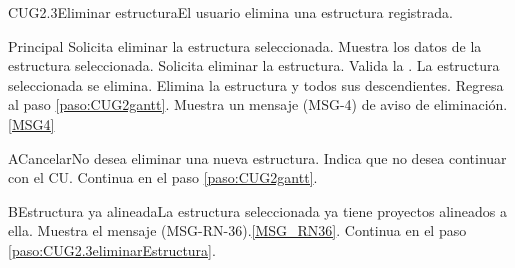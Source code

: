 	\begin{UseCase}{CUG2.3}{Eliminar estructura}{El usuario elimina una estructura registrada.}
	\end{UseCase}

	\begin{UCtrayectoria}{Principal}
		\UCpaso[\UCactor] Solicita eliminar la estructura seleccionada.
		\UCpaso Muestra los datos de la estructura seleccionada. \label{paso:CUG2.3eliminarEstructura}
		\UCpaso [\UCactor] Solicita eliminar la estructura. 
		\UCpaso Valida la . 
		\UCpaso La estructura seleccionada se elimina.
		\UCpaso Elimina la estructura y todos sus descendientes.
		\UCpaso Regresa al paso \ref{paso:CUG2gantt}.
		\UCpaso Muestra un mensaje (MSG-4) de aviso de eliminación.\ref{MSG4}
	\end{UCtrayectoria}

	\begin{UCtrayectoriaA}{A}{Cancelar}{No desea eliminar una nueva estructura.}
		\UCpaso[\UCactor] Indica que no desea continuar con el CU.
		\UCpaso Continua en el paso \ref{paso:CUG2gantt}.
	\end{UCtrayectoriaA}

	\begin{UCtrayectoriaA}{B}{Estructura ya alineada}{La estructura seleccionada ya tiene proyectos alineados a ella.}
		\UCpaso Muestra el mensaje (MSG-RN-36).\ref{MSG_RN36}.
		\UCpaso Continua en el paso \ref{paso:CUG2.3eliminarEstructura}.
	\end{UCtrayectoriaA}